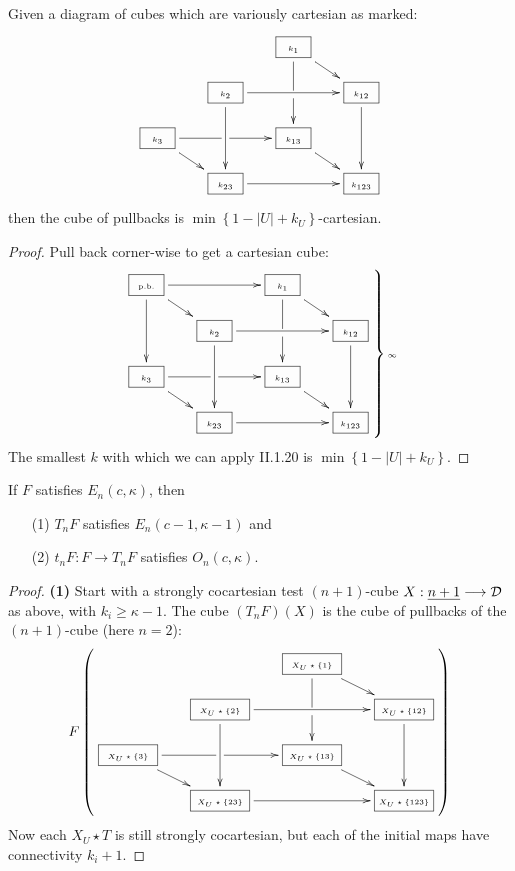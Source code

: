 \documentclass[11pt]{article}
\newcommand\ST{\rule[-.25em]{0pt}{1.25em}}
\begin{document}
\begin{Calculus II}
\begin{prop*}[II.1.22]
Given a diagram of cubes which are variously cartesian as marked:
\[ 
\vcenter{\xymatrix@R=.4cm@C=.6cm{
&&
\framebox[9mm][c]{\tiny$k_1$\ST}   \ar'[d][dd]\ar[rd]\\&
\framebox[9mm][c]{\tiny$k_2$\ST} \ar[dd]\ar[rr] &&
\framebox[9mm][c]{\tiny$k_{12}$\ST} \ar[dd] \\
\framebox[9mm][c]{\tiny$k_3$\ST}  \ar'[r][rr]\ar[rd] &&
\framebox[9mm][c]{\tiny$k_{13}$\ST}  \ar[rd] \\&
\framebox[9mm][c]{\tiny$k_{23}$\ST} \ar[rr] &&
\framebox[9mm][c]{\tiny$k_{123}$\ST}
}}\]
then the cube of pullbacks is $\min\left\{1-|U|+k_U\right\}$-cartesian.
\end{prop*}
\begin{proof}
Pull back corner-wise to get a cartesian cube: 
\[ 
\left.\vcenter{\xymatrix@R=.4cm@C=.6cm{
\framebox[9mm][c]{\tiny p.b.\ST} \ar[dd]\ar[rd]\ar[rr] &&
\framebox[9mm][c]{\tiny$k_1$\ST}   \ar'[d][dd]\ar[rd]\\&
\framebox[9mm][c]{\tiny$k_2$\ST} \ar[dd]\ar[rr] &&
\framebox[9mm][c]{\tiny$k_{12}$\ST} \ar[dd] \\
\framebox[9mm][c]{\tiny$k_3$\ST}  \ar'[r][rr]\ar[rd] &&
\framebox[9mm][c]{\tiny$k_{13}$\ST}  \ar[rd] \\&
\framebox[9mm][c]{\tiny$k_{23}$\ST} \ar[rr] &&
\framebox[9mm][c]{\tiny$k_{123}$\ST}
}}\right\}\textup{\tiny$\infty$}\]
The smallest $k$ with which we can apply II.1.20 is $\min\left\{1-|U|+k_U\right\}$.
\end{proof}






\begin{prop*}[III.1.4]
If $F$ satisfies $E_n(c,\kappa)$, then
\begin{enumerate}\squishlist
\setlength{\parindent}{.25in}
\item[\textup{(1)}] $T_nF$ satisfies
$E_n({c-1},\kappa -1)$ and
\item[\textup{(2)}] $t_nF:F\to T_nF$ satisfies
$O_n(c,\kappa)$.
\end{enumerate}
\end{prop*}
\begin{proof} \textbf{(1)}
Start with a strongly cocartesian test $(n+1)$-cube $X:\underline{n+1}\longrightarrow\mathcal{D}$ as above, with $k_i\geq\kappa-1$. The cube $(T_nF)(X)$ is the cube of pullbacks of the $(n+1)$-cube (here $n=2$):
\[ 
F\left(\vcenter{\xymatrix@R=.4cm@C=.6cm{
&&
\framebox[15mm][c]{\tiny$X_U\star\{1\}$\ST}   \ar'[d][dd]\ar[rd]\\&
\framebox[15mm][c]{\tiny$X_U\star\{2\}$\ST} \ar[dd]\ar[rr] &&
\framebox[15mm][c]{\tiny$X_U\star\{12\}$\ST} \ar[dd] \\
\framebox[15mm][c]{\tiny$X_U\star\{3\}$\ST}  \ar'[r][rr]\ar[rd] &&
\framebox[15mm][c]{\tiny$X_U\star\{13\}$\ST}  \ar[rd] \\&
\framebox[15mm][c]{\tiny$X_U\star\{23\}$\ST} \ar[rr] &&
\framebox[15mm][c]{\tiny$X_U\star\{123\}$\ST}
}}\right)\]
Now each $X_U\star T$ is still strongly cocartesian, but each of the initial maps have connectivity $k_i+1$.


\end{proof}
\end{Calculus II}
\end{document}
